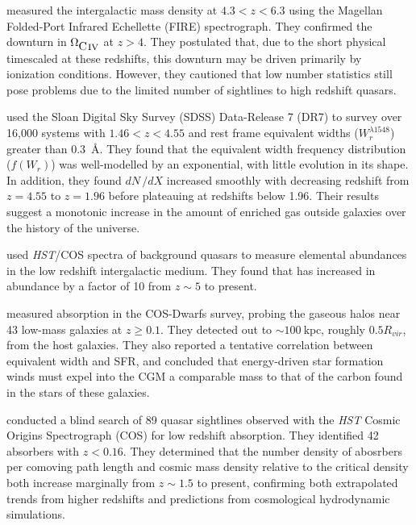 \documentclass[linenumbers,twocolumn]{aastex61}
\begin{document}
\cite{Simcoe2011} measured the intergalactic {\CIV} mass density at $4.3 < z < 6.3$ using the Magellan Folded-Port Infrared Echellette (FIRE) spectrograph. They confirmed the downturn in $\Omega_{\hbox{{\rm C}\kern 0.1em{\sc iv}}}$ at $z > 4$. They postulated that, due to the short physical timescaled at these redshifts, this downturn may be driven primarily by ionization conditions. However, they cautioned that low number statistics still pose problems due to the limited number of sightlines to high redshift quasars.

\cite{Cooksey2013} used the Sloan Digital Sky Survey (SDSS) Data-Release 7 (DR7) to survey over 16,000 {\CIV} systems with $1.46 < z < 4.55$ and rest frame equivalent widths ($W_r^{\lambda1548}$) greater than $0.3$~{\AA}. They found that the equivalent width frequency distribution ($f(W_r)$) was well-modelled by an exponential, with little evolution in its shape. In addition, they found $dN\,/dX$ increased smoothly with decreasing redshift from $z = 4.55$ to $z = 1.96$ before plateauing at redshifts below 1.96. Their results suggest a monotonic increase in the amount of {\CIV} enriched gas outside galaxies over the history of the universe.

\cite{Shull2014} used {\it HST}/COS spectra of background quasars to measure elemental abundances in the low redshift intergalactic medium. They found that {\CIV} has increased in abundance by a factor of 10 from $z \sim 5$ to present.

\cite{Bordoloi2014} measured {\CIV} absorption in the COS-Dwarfs survey, probing the gaseous halos near 43 low-mass galaxies at $z \ge 0.1$. They detected {\CIV} out to $\sim 100~\mathrm{kpc}$, roughly $0.5 R_{vir}$, from the host galaxies. They also reported a tentative correlation between {\CIV} equivalent width and SFR, and concluded that energy-driven star formation winds must expel into the CGM a comparable mass to that of the carbon found in the stars of these galaxies.

\cite{Burchett2015} conducted a blind search of 89 quasar sightlines observed with the {\it HST} Cosmic Origins Spectrograph (COS) for low redshift {\CIV} absorption. They identified 42 absorbers with $z < 0.16$. They determined that the number density of {\CIV} abosrbers per comoving path length and cosmic mass density relative to the critical density both increase marginally from $z \sim 1.5$ to present, confirming both extrapolated trends from higher redshifts and predictions from cosmological hydrodynamic simulations.
\end{document}
